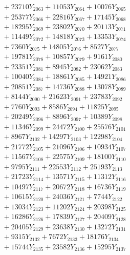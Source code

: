 \documentclass[a4paper,10pt]{article}
\begin{document}
{\begin{align}
&\;  + 23710 Y_{2063} + 11053 Y_{2064} + 10076 Y_{2065} \\[0.3ex]
&\;  + 25377 Y_{2066} + 22816 Y_{2067} + 17145 Y_{2068} \\[0.5ex]\allowbreak
&\;  + 18295 Y_{2069} + 23802 Y_{2070} + 20113 Y_{2071} \\[0.3ex]
&\;  + 11449 Y_{2072} + 14818 Y_{2073} + 13353 Y_{2074} \\[0.3ex]
&\;  + 7360 Y_{2075} + 14805 Y_{2076} + 8527 Y_{2077} \\[0.3ex]
&\;  + 19781 Y_{2078} + 10857 Y_{2079} + 9161 Y_{2080} \\[0.3ex]
&\;  + 23351 Y_{2081} + 8945 Y_{2082} + 23062 Y_{2083} \\[0.3ex]
&\;  + 10040 Y_{2084} + 18861 Y_{2085} + 14921 Y_{2086} \\[0.3ex]
&\;  + 20851 Y_{2087} + 14736 Y_{2088} + 13078 Y_{2089} \\[0.3ex]
&\;  + 8144 Y_{2090} + 21623 Y_{2091} + 23783 Y_{2092} \\[0.3ex]
&\;  + 7760 Y_{2093} + 8586 Y_{2094} + 11825 Y_{2095} \\[0.3ex]
&\;  + 20249 Y_{2096} + 8896 Y_{2097} + 10389 Y_{2098} \\[0.5ex]\allowbreak
&\;  + 11346 Y_{2099} + 24472 Y_{2100} + 25576 Y_{2101} \\[0.3ex]
&\;  + 8967 Y_{2102} + 14297 Y_{2103} + 12298 Y_{2104} \\[0.3ex]
&\;  + 21772 Y_{2105} + 21096 Y_{2106} + 10934 Y_{2107} \\[0.3ex]
&\;  + 11567 Y_{2108} + 22575 Y_{2109} + 18100 Y_{2110} \\[0.3ex]
&\;  + 9795 Y_{2111} + 22553 Y_{2112} + 25193 Y_{2113} \\[0.3ex]
&\;  + 21723 Y_{2114} + 13571 Y_{2115} + 11312 Y_{2116} \\[0.3ex]
&\;  + 10497 Y_{2117} + 20672 Y_{2118} + 16736 Y_{2119} \\[0.3ex]
&\;  + 10615 Y_{2120} + 24036 Y_{2121} + 7744 Y_{2122} \\[0.3ex]
&\;  + 13034 Y_{2123} + 11202 Y_{2124} + 20398 Y_{2125} \\[0.3ex]
&\;  + 16286 Y_{2126} + 17839 Y_{2127} + 20409 Y_{2128} \\[0.5ex]\allowbreak
&\;  + 20405 Y_{2129} + 23638 Y_{2130} + 13272 Y_{2131} \\[0.3ex]
&\;  + 9315 Y_{2132} + 7672 Y_{2133} + 18176 Y_{2134} \\[0.3ex]
&\;  + 15744 Y_{2135} + 23582 Y_{2136} + 15295 Y_{2137} \\[0.3ex]

\end{align}}
\end{document}
